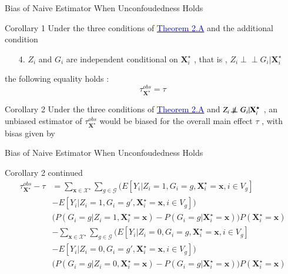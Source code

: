 \documentclass[notes,11pt, aspectratio=169]{beamer}
\begin{document}
\begin{frame}{Bias of Naive Estimator When Unconfoudedness Holds}
\begin{block}{Corollary 1}
Under the three conditions of \hyperlink{theorem2.A}{\textcolor{blue}{Theorem 2.A}} and the additional condition
\begin{enumerate}
    \item[4.] $Z_i$ and $G_i$ are independent conditional on $\mathbf{X}_{i}^\star$ , that is , $Z_i \perp\!\!\!\perp G_i |\mathbf{X}_{i}^\star$
\end{enumerate}
%
the following equality holds :
\begin{equation*}
    \tau_{\mathbf{X}^\star}^{obs}=\tau
\end{equation*}
%
\end{block}
\begin{block}{Corollary 2}
Under the three conditions of \hyperlink{theorem2.A}{\textcolor{blue}{Theorem 2.A}} and $Z_i \not \! \perp\!\!\!\perp G_i |\mathbf{X}_{i}^\star$ , an unbiased estimator of $\tau_{\mathbf{X}^\star}^{obs}$ would be biased for the overall main effect $\tau$ , with bisas given by
%
\end{block}
\end{frame}


\begin{frame}{Bias of Naive Estimator When Unconfoudedness Holds}
\begin{block}{Corollary 2 continued}
\begin{align*}
   \tau_{\mathbf{X}^\star}^{obs}-\tau &=\sum_{\mathbf{x} \in \mathcal{X}^\star}  \sum_{g \in \mathcal{G}} \Big( E[Y_i|Z_i=1 , G_i=g , \mathbf{X}_{i}^\star =\mathbf{x}, i \in V_g]
\\ &   -E[Y_i|Z_i=1,G_i=g' , \mathbf{X}_{i}^\star =\mathbf{x} , i \in V_g]\Big)
\\ & \Big(P(G_i=g | Z_i=1,\mathbf{X}_{i}^\star=\mathbf{x}) - P(G_i=g | \mathbf{X}_{i}^\star=\mathbf{x})   \Big)  P(\mathbf{X}_{i}^\star=\mathbf{x})
\\ & - \sum_{\mathbf{x} \in \mathcal{X}^\star}  \sum_{g \in \mathcal{G}} \Big(E[Y_i|Z_i=0 , G_i=g , \mathbf{X}_{i}^\star =\mathbf{x}, i \in V_g]
\\  &  -E[Y_i|Z_i=0,G_i=g' , \mathbf{X}_{i}^\star =\mathbf{x} , i \in V_g]\Big)
\\ & \Big(P(G_i=g | Z_i=0,\mathbf{X}_{i}^\star=\mathbf{x}) - P(G_i=g | \mathbf{X}_{i}^\star=\mathbf{x})   \Big)  P(\mathbf{X}_{i}^\star=\mathbf{x})
\end{align*}
\end{block}
\end{frame}
\end{document}
